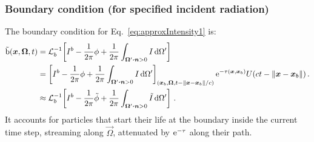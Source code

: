 \subsubsection{Boundary condition (for specified incident radiation)}
The boundary condition for Eq.~\eqref{eq:approxIntensity1} is:
\begin{align*}
  \mathrm{ \tilde b }(\bm{x}, \bm{\Omega}, t) &=
   \mathcal{L}_{b}^{-1}\!\left[I^b - \frac{1}{2\pi} \phi
 + \frac{1}{2\pi} \int_{\bm{\Omega}' \bm{\cdot} \bm{n} > 0} I \mathop{}\!\mathrm{d}\Omega'\right]
  \\
  &= \left[ I^b - \frac{1}{2\pi} \phi
 + \frac{1}{2\pi} \int_{\bm{\Omega}' \bm{\cdot} \bm{n} > 0} I\mathop{}\!\mathrm{d}\Omega'
 \right]_{(\bm{x}_b, \bm{\Omega}, t - \left\| \bm{x} - \bm{x}_b \right\|/c)}
    \mathop{}\!\mathrm{e}^{ -\tau(\bm{x}, \bm{x}_b)} U(ct - \left\| \bm{x} - \bm{x}_b \right\|)\,.
  \\
  &\approx \mathcal{L}_{b}^{-1}\!\left[ I^b - \frac{1}{2\pi} \tilde \phi
 + \frac{1}{2\pi} \int_{\bm{\Omega}' \bm{\cdot} \bm{n} > 0}
 \tilde I\mathop{}\!\mathrm{d}\Omega'
 \right]\,.
\end{align*}
It accounts for particles that start their life at the boundary inside the
current time step, streaming along $\vec{\Omega}$, attenuated by $\mathop{}\!\mathrm{e}^{
-\tau}$ along their path.

